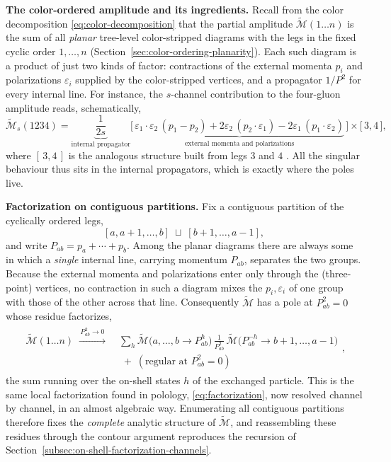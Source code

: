 \textbf{The color-ordered amplitude and its ingredients.} Recall from the color decomposition \eqref{eq:color-decomposition} that the partial amplitude $\widetilde{\mathcal{M}}(1 \ldots n)$ is the sum of all \emph{planar} tree-level color-stripped diagrams with the legs in the fixed cyclic order $1, \ldots, n$ (Section~\ref{sec:color-ordering-planarity}). Each such diagram is a product of just two kinds of factor: contractions of the external momenta $p_i$ and polarizations $\varepsilon_i$ supplied by the color-stripped vertices, and a propagator $1/P^2$ for every internal line. For instance, the $s$-channel contribution to the four-gluon amplitude reads, schematically,
\[
	\widetilde{\mathcal{M}}_s(1234) = \underbrace{\frac{1}{2s}}_{\text{internal propagator}}
	\Big[\, \underbrace{\varepsilon_1 \cdot \varepsilon_2\,(p_1 - p_2) + 2\varepsilon_2\,(p_2 \cdot \varepsilon_1) - 2\varepsilon_1\,(p_1 \cdot \varepsilon_2)}_{\text{external momenta and polarizations}} \,\Big] \times \big[\, 3, 4 \,\big]
,\]
where $[\,3,4\,]$ is the analogous structure built from legs $3$ and $4$ \autocite[(27.95),(27.84)]{schwartzQFT2014}. All the singular behaviour thus sits in the internal propagators, which is exactly where the poles live.

\textbf{Factorization on contiguous partitions.} Fix a contiguous partition of the cyclically ordered legs,
\[
	[a, a+1, \ldots, b] \;\sqcup\; [b+1, \ldots, a-1]
,\]
and write $P_{ab} = p_a + \cdots + p_b$. Among the planar diagrams there are always some in which a \emph{single} internal line, carrying momentum $P_{ab}$, separates the two groups. Because the external momenta and polarizations enter only through the (three-point) vertices, no contraction in such a diagram mixes the $p_i, \varepsilon_i$ of one group with those of the other across that line. Consequently $\widetilde{\mathcal{M}}$ has a pole at $P_{ab}^2 = 0$ whose residue factorizes,
\begin{align}
	\label{eq:bcfw-channel-factorization}
	\begin{split}
	\widetilde{\mathcal{M}}(1 \ldots n)
	\;\xrightarrow{\,P_{ab}^2 \to 0\,}\;
	&\sum_{h} \widetilde{\mathcal{M}}\big(a, \ldots, b \rightarrow P_{ab}^{h}\big)\,
	\frac{1}{P_{ab}^2}\,
	\widetilde{\mathcal{M}}\big(P_{ab}^{-h} \rightarrow b+1, \ldots, a-1\big) \\
	&\;+\; (\text{regular at } P_{ab}^2 = 0)
	\end{split}
,\end{align}
the sum running over the on-shell states $h$ of the exchanged particle. This is the same local factorization found in polology, \eqref{eq:factorization}, now resolved channel by channel, in an almost algebraic way. Enumerating all contiguous partitions therefore fixes the \emph{complete} analytic structure of $\widetilde{\mathcal{M}}$, and reassembling these residues through the contour argument reproduces the recursion of Section~\ref{subsec:on-shell-factorization-channels}.

